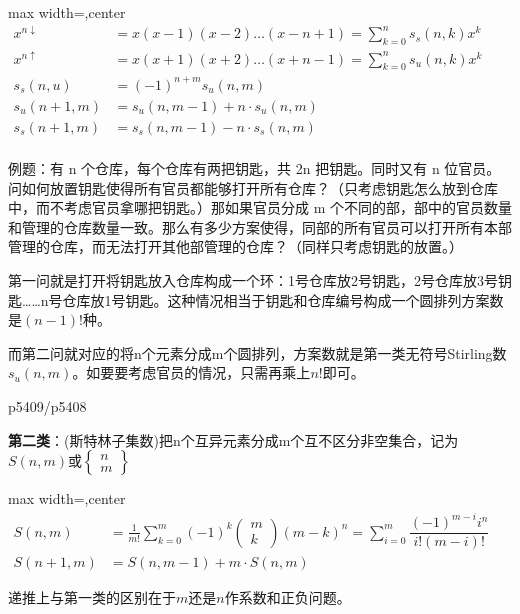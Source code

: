 \documentclass[twocolumn,10pt]{ctexart}
\begin{document}
\begin{adjustbox}{max width=\linewidth,center}
$\begin{aligned}
x^{n\downarrow}&=x(x-1)(x-2)\dots(x-n+1)=\sum_{k=0}^ns_s(n,k)x^k\\
x^{n\uparrow}&=x(x+1)(x+2)\dots(x+n-1)=\sum_{k=0}^ns_u(n,k)x^k\\
s_s(n,u)&=(-1)^{n+m}s_u(n,m)\\
s_u(n+1,m)&=s_u(n,m-1)+n\cdot s_u(n,m)\\
s_s(n+1,m)&=s_s(n,m-1)-n\cdot s_s(n,m)\\
\end{aligned}$
\end{adjustbox}

\begin{notebox}
例题：有 n 个仓库，每个仓库有两把钥匙，共 2n 把钥匙。同时又有 n 位官员。问如何放置钥匙使得所有官员都能够打开所有仓库？（只考虑钥匙怎么放到仓库中，而不考虑官员拿哪把钥匙。）那如果官员分成 m 个不同的部，部中的官员数量和管理的仓库数量一致。那么有多少方案使得，同部的所有官员可以打开所有本部管理的仓库，而无法打开其他部管理的仓库？（同样只考虑钥匙的放置。）

第一问就是打开将钥匙放入仓库构成一个环：1号仓库放2号钥匙，2号仓库放3号钥匙……n号仓库放1号钥匙。这种情况相当于钥匙和仓库编号构成一个圆排列方案数是$(n-1)!$种。

而第二问就对应的将n个元素分成m个圆排列，方案数就是第一类无符号Stirling数$s_u(n,m)$。如要要考虑官员的情况，只需再乘上$n!$即可。
\end{notebox}

p5409/p5408

\textbf{第二类}：(斯特林子集数)把n个互异元素分成m个互不区分非空集合，记为$S(n,m)$或$\left\{\begin{matrix}n\\m\end{matrix}\right\}$

\begin{adjustbox}{max width=\linewidth,center}
$\begin{aligned}
S(n,m)&=\frac{1}{m!}\sum_{k=0}^m(-1)^k\left(\begin{matrix}m\\k\end{matrix}\right)(m-k)^n=\sum_{i=0}^m\dfrac{(-1)^{m-i}i^n}{i!(m-i)!}\\
S(n+1,m)&=S(n,m-1)+m\cdot S(n,m)
\end{aligned}$
\end{adjustbox}

递推上与第一类的区别在于$m$还是$n$作系数和正负问题。
\end{document}
